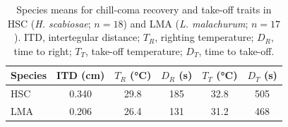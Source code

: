 \documentclass[11pt,a4paper]{article}
\begin{document}
\begin{table}[!htbp]
\centering
\caption{Species means for chill-coma recovery and take-off traits in HSC (\textit{H. scabiosae}; $n = 18$) and LMA (\textit{L. malachurum}; $n = 17$). ITD, intertegular distance; $T_R$, righting temperature; $D_R$, time to right; $T_T$, take-off temperature; $D_T$, time to take-off.}
\label{tab:species_chill_coma}

\small
\renewcommand{\arraystretch}{1.1}

\begin{tabular}{lccccc}
\toprule
Species & ITD (cm) & $T_R$ (°C) & $D_R$ (s) & $T_T$ (°C) & $D_T$ (s) \\
\midrule
HSC & 0.340 & 29.8 & 185 & 32.8 & 505 \\
LMA & 0.206 & 26.4 & 131 & 31.2 & 468 \\
\bottomrule
\end{tabular}
\end{table}

\end{document}

